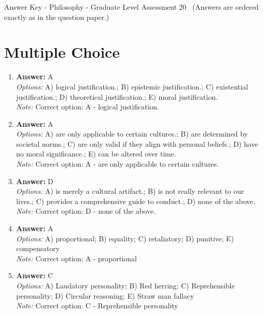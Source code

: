 \documentclass[12pt]{article}
\begin{document}
\begin{center}
Answer Key - Philosophy - Graduate Level Assessment 20 \
\small (Answers are ordered exactly as in the question paper.)
\end{center}

\section*{Multiple Choice}
\begin{enumerate}[label=\arabic*.]
\item \textbf{Answer:} A
\\ \textit{Options:} A) logical justification.; B) epistemic justification.; C) existential justification.; D) theoretical justification.; E) moral justification.
\\ \textit{Note:} Correct option: A - logical justification.
\item \textbf{Answer:} A
\\ \textit{Options:} A) are only applicable to certain cultures.; B) are determined by societal norms.; C) are only valid if they align with personal beliefs.; D) have no moral significance.; E) can be altered over time.
\\ \textit{Note:} Correct option: A - are only applicable to certain cultures.
\item \textbf{Answer:} D
\\ \textit{Options:} A) is merely a cultural artifact.; B) is not really relevant to our lives.; C) provides a comprehensive guide to conduct.; D) none of the above.
\\ \textit{Note:} Correct option: D - none of the above.
\item \textbf{Answer:} A
\\ \textit{Options:} A) proportional; B) equality; C) retaliatory; D) punitive; E) compensatory
\\ \textit{Note:} Correct option: A - proportional
\item \textbf{Answer:} C
\\ \textit{Options:} A) Laudatory personality; B) Red herring; C) Reprehensible personality; D) Circular reasoning; E) Straw man fallacy
\\ \textit{Note:} Correct option: C - Reprehensible personality
\end{enumerate}
\end{document}
